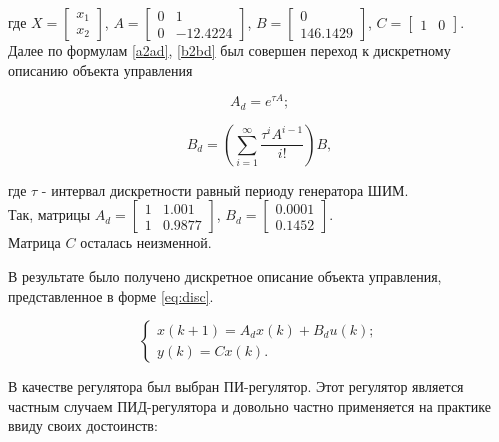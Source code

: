 где $X=\begin{bmatrix}x_1\\x_2\end{bmatrix}$, $A=\begin{bmatrix}0&1\\0& -12.4224\end{bmatrix}$, 
$B=\begin{bmatrix}0\\146.1429\end{bmatrix}$, $C=\begin{bmatrix}1&0\end{bmatrix}$.\\

Далее по формулам \ref{a2ad}, \ref{b2bd} был совершен переход к дискретному описанию объекта управления  

\begin{equation}
  A_d=e^{\tau A};
  \label{eq:a2ad}
\end{equation}

\begin{equation}
  B_d=(\sum\limits_{i=1}^{\infty}\frac{\tau^iA^{i-1}}{i!})B,
  \label{eq:b2bd}
\end{equation}

где $\tau$ - интервал дискретности равный периоду генератора ШИМ.\\

Так, матрицы $A_d=\begin{bmatrix}1&1.001\\1& 0.9877\end{bmatrix}$, 
$B_d=\begin{bmatrix}0.0001\\0.1452\end{bmatrix}$.\\

Матрица $C$ осталась неизменной.

В результате было получено дискретное описание объекта управления, 
представленное в форме \ref{eq:disc}.

\begin{equation}
  \begin{cases}
    x(k + 1) = A_dx(k) + B_du(k);
    \\
    y(k) = Cx(k).
  \end{cases}
  \label{eq:disc}
\end{equation}

В качестве регулятора был выбран ПИ-регулятор. Этот регулятор является частным случаем ПИД-регулятора
и довольно частно применяется на практике ввиду своих достоинств:

